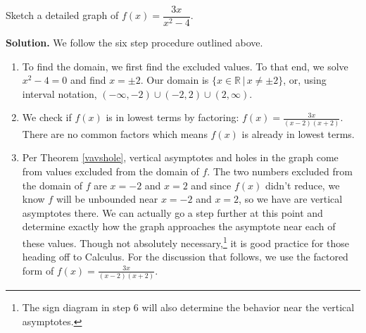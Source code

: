 \documentclass{ximera}
\begin{document}
\begin{example}  Sketch a detailed graph of $f(x) = \dfrac{3x}{x^2-4}$.

\smallskip

{\bf Solution.}  We follow the six step procedure outlined above.

\begin{enumerate}

\item  To find the domain, we first find the excluded values.  To that end, we solve  $x^2 - 4 = 0$ and find $x = \pm 2$. Our domain is $\{ x \in \mathbb{R} \, | \,  x \neq \pm 2\}$, or, using interval notation,  $(-\infty, -2) \cup (-2,2) \cup (2,\infty)$.

\item  We check if  $f(x)$ is in lowest terms by factoring: $f(x) = \frac{3x}{(x-2)(x+2)}$.  There are no common factors which means $f(x)$ is already in lowest terms.

\item  Per Theorem \ref{vavshole}, vertical asymptotes and holes in the graph come from values excluded from the domain of $f$.  The two numbers excluded from the domain of $f$ are $x = -2$ and $x=2$ and since  $f(x)$ didn't reduce,  we know $f$ will be unbounded near  $x=-2$ and $x=2$, so we have are vertical asymptotes there.  We can actually go a step further at this point and determine exactly how the graph approaches the asymptote near each of these values. Though not absolutely necessary,\footnote{The sign diagram in step 6 will also determine the behavior near the vertical asymptotes.} it is good practice for those heading off to Calculus.  For the discussion that follows,  we use the factored form of $f(x) = \frac{3x}{(x-2)(x+2)}$.

\begin{itemize}


\end{itemize}
\end{enumerate}
\end{example}
\end{document}
